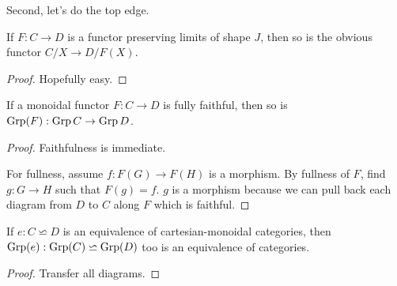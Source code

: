 Second, let's do the top edge.


\begin{proposition}
  \label{0-over-lim}
  \uses{}
  \leanok

  If $F : C \to D$ is a functor preserving limits of shape $J$, then so is the obvious functor $C / X \to D / F(X)$.
\end{proposition}
\begin{proof}
  \uses{}

  Hopefully easy.
\end{proof}


\begin{proposition}
  \label{0-full-faithful-grp}
  \uses{}
  \leanok

  If a monoidal functor $F : C \to D$ is fully faithful, then so is $\operatorname{Grp}(F) : \operatorname{Grp} C \to \operatorname{Grp} D$.
\end{proposition}
\begin{proof}
  \uses{}
  \leanok

  Faithfulness is immediate.

  For fullness, assume $f : F(G) \to F(H)$ is a morphism. By fullness of $F$, find $g : G \to H$ such that $F(g) = f$. $g$ is a morphism because we can pull back each diagram from $D$ to $C$ along $F$ which is faithful.
\end{proof}


\begin{proposition}
  \label{0-grp-equiv}
  \uses{}

  If $e : C \backsimeq D$ is an equivalence of cartesian-monoidal categories, then $\operatorname{Grp}(e) : \operatorname{Grp}(C) \backsimeq \operatorname{Grp}(D)$ too is an equivalence of categories.
\end{proposition}
\begin{proof}
  \uses{}

  Transfer all diagrams.
\end{proof}


